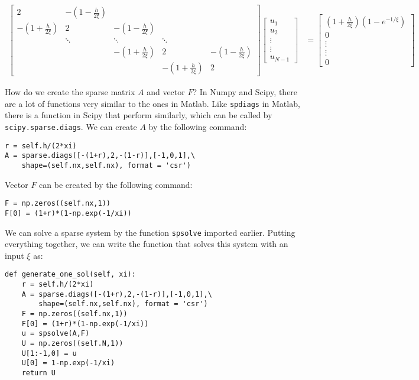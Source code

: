 \documentclass{article}
\begin{document}
\begin{align*}
\begin{bmatrix}
2 & -(1-\frac{h}{2\xi}) &  &  &  \\
-(1+\frac{h}{2\xi}) & 2 & -(1-\frac{h}{2\xi}) &  &  \\
 & \ddots & \ddots & \ddots &  \\
 &  & -(1+\frac{h}{2\xi}) & 2 & -(1-\frac{h}{2\xi})\\
 &  &  & -(1+\frac{h}{2\xi}) & 2
\end{bmatrix}
\begin{bmatrix}
u_1\\
u_2\\
\vdots\\
\vdots\\
u_{N-1}
\end{bmatrix} &=
\begin{bmatrix}
(1+\frac{h}{2\xi})(1-e^{-1/\xi})\\
0\\
\vdots\\
\vdots\\
0
\end{bmatrix}
\end{align*}

How do we create the sparse matrix $A$ and vector $F$? In Numpy and Scipy, there are a lot of functions very similar to the ones in Matlab. Like \texttt{spdiags} in Matlab, there is a function in Scipy that perform similarly, which can be called by \texttt{scipy.sparse.diags}. We can create $A$ by the following command:
\begin{center}
\begin{lstlisting}
r = self.h/(2*xi)
A = sparse.diags([-(1+r),2,-(1-r)],[-1,0,1],\
	shape=(self.nx,self.nx), format = 'csr')
\end{lstlisting}
\end{center}

Vector $F$ can be created by the following command:
\begin{center}
\texttt{F = np.zeros((self.nx,1))}\\
\texttt{F[0] = (1+r)*(1-np.exp(-1/xi))} 
\end{center}

We can solve a sparse system by the function \texttt{spsolve} imported earlier. Putting everything together, we can write the function that solves this system with an input $\xi$ as:
\begin{lstlisting}
def generate_one_sol(self, xi):
	r = self.h/(2*xi)
	A = sparse.diags([-(1+r),2,-(1-r)],[-1,0,1],\
		shape=(self.nx,self.nx), format = 'csr')
	F = np.zeros((self.nx,1))
	F[0] = (1+r)*(1-np.exp(-1/xi))
	u = spsolve(A,F)
	U = np.zeros((self.N,1))
	U[1:-1,0] = u
	U[0] = 1-np.exp(-1/xi)
	return U
\end{lstlisting}
\end{document}
